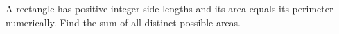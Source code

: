 A rectangle has positive integer side lengths and its area equals its perimeter numerically. Find the sum of all distinct possible areas.
